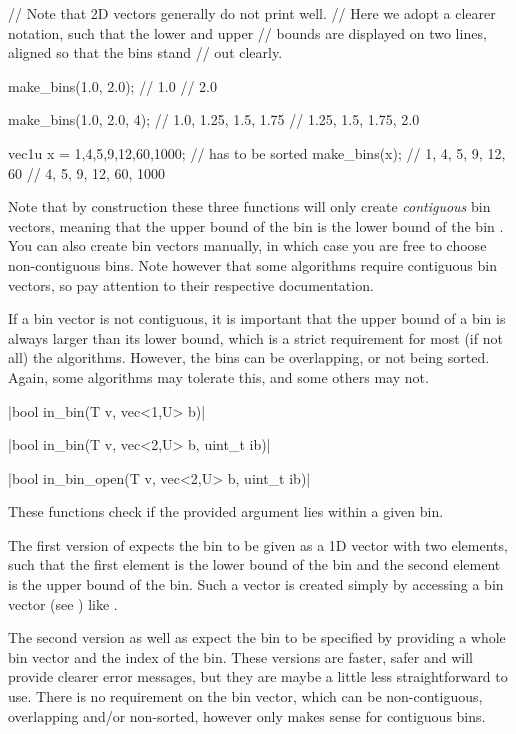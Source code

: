 \begin{example}
\begin{cppcode}
// Note that 2D vectors generally do not print well.
// Here we adopt a clearer notation, such that the lower and upper
// bounds are displayed on two lines, aligned so that the bins stand
// out clearly.

make_bins(1.0, 2.0); // {1.0}
                     // {2.0}

make_bins(1.0, 2.0, 4); // {1.0,  1.25, 1.5,  1.75}
                        // {1.25, 1.5,  1.75, 2.0}

vec1u x = {1,4,5,9,12,60,1000}; // has to be sorted
make_bins(x);
// {1, 4, 5, 9,  12, 60}
// {4, 5, 9, 12, 60, 1000}
\end{cppcode}
\end{example}

Note that by construction these three functions will only create \emph{contiguous} bin vectors, meaning that the upper bound of the bin  is the lower bound of the bin . You can also create bin vectors manually, in which case you are free to choose non-contiguous bins. Note however that some algorithms require contiguous bin vectors, so pay attention to their respective documentation.

If a bin vector is not contiguous, it is important that the upper bound of a bin is always larger than its lower bound, which is a strict requirement for most (if not all) the algorithms. However, the bins can be overlapping, or not being sorted. Again, some algorithms may tolerate this, and some others may not.

\funcitem \vectorfunc \cppinline|bool in_bin(T v, vec<1,U> b)| 

\vectorfunc \cppinline|bool in_bin(T v, vec<2,U> b, uint_t ib)|

\vectorfunc \cppinline|bool in_bin_open(T v, vec<2,U> b, uint_t ib)| 

These functions check if the provided argument lies within a given bin.

The first version of  expects the bin to be given as a 1D vector with two elements, such that the first element is the lower bound of the bin and the second element is the upper bound of the bin. Such a vector is created simply by accessing a bin vector (see ) like .

The second version as well as  expect the bin to be specified by providing a whole bin vector and the index of the bin. These versions are faster, safer and will provide clearer error messages, but they are maybe a little less straightforward to use. There is no requirement on the bin vector, which can be non-contiguous, overlapping and/or non-sorted, however  only makes sense for contiguous bins.

